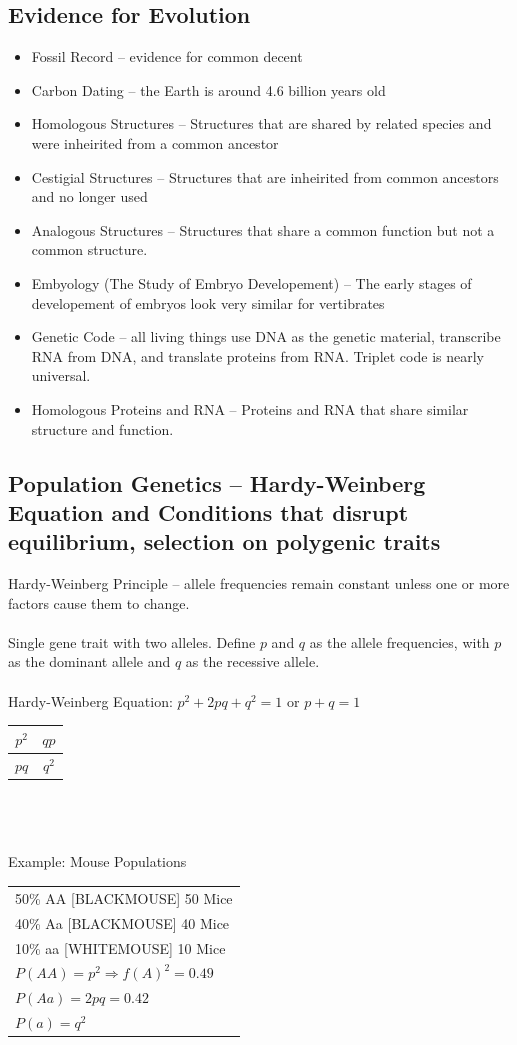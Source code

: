\documentclass{article}
\begin{document}
\subsection{Evidence for Evolution}
\begin{itemize}
\item Fossil Record -- evidence for common decent
\item Carbon Dating -- the Earth is around 4.6 billion years old
\item Homologous Structures -- Structures that are shared by related species and were inheirited from a common ancestor
\item Cestigial Structures -- Structures that are inheirited from common ancestors and no longer used
\item Analogous Structures -- Structures that share a common function but not a common structure.
\item Embyology (The Study of Embryo Developement) -- The early stages of developement of embryos look very similar for vertibrates
\item Genetic Code -- all living things use DNA as the genetic material, transcribe RNA from DNA, and translate proteins from RNA. Triplet code is nearly universal.
\item Homologous Proteins and RNA -- Proteins and RNA that share similar structure and function.
\end{itemize}

\subsection{Population Genetics -- Hardy-Weinberg Equation and Conditions that disrupt equilibrium, selection on polygenic traits}
Hardy-Weinberg Principle -- allele frequencies remain constant unless one or more factors cause them to change.\\
\\
Single gene trait with two alleles. Define $p$ and $q$ as the allele frequencies, with $p$ as the dominant allele and $q$ as the recessive allele.\\
\\
Hardy-Weinberg Equation: $p^{2}+2pq+q^{2}=1$ or $p+q=1$\\

\begin{tabular}{| c | c |}
\hline
$p^{2}$ & $qp$\\
\hline
$pq$ & $q^{2}$\\
\hline
\end{tabular}
\\
\\
\\
Example: Mouse Populations\\
\begin{tabular}{|p{10cm}}
50\% AA [BLACKMOUSE] 50 Mice\\
40\% Aa [BLACKMOUSE] 40 Mice\\
10\% aa [WHITEMOUSE] 10 Mice\\
$P(AA)=p^{2}\Rightarrow f(A)^{2}=0.49$\\
$P(Aa)=2pq=0.42$\\
$P(a)=q^{2}$\\
\end{tabular}
\end{document}
